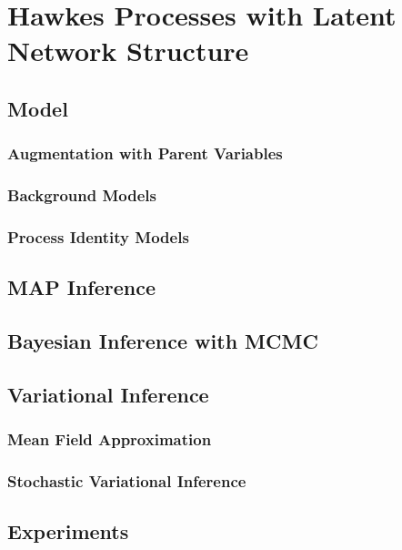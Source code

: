 
\chapter{Hawkes Processes with Latent Network Structure}

\section{Model}

\subsection{Augmentation with Parent Variables}

\subsection{Background Models}

\subsection{Process Identity Models}

\section{MAP Inference}

\section{Bayesian Inference with MCMC}

\section{Variational Inference}

\subsection{Mean Field Approximation}

\subsection{Stochastic Variational Inference}

\section{Experiments}




